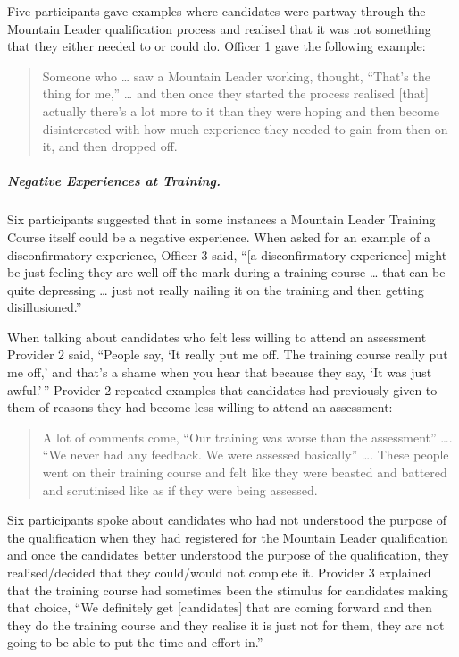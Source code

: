 \documentclass[
  12pt,
  a4paper,
]{book}
\begin{document}
Five participants gave examples where candidates were partway through the Mountain Leader qualification process and realised that it was not something that they either needed to or could do. Officer 1 gave the following example:

\begin{quote}
Someone who \ldots{} saw a Mountain Leader working, thought, ``That's the thing for me,'' \ldots{} and then once they started the process realised {[}that{]} actually there's a lot more to it than they were hoping and then become disinterested with how much experience they needed to gain from then on it, and then dropped off.
\end{quote}

\hypertarget{negative-experiences-at-training.}{%
\subparagraph{Negative Experiences at Training.}\label{negative-experiences-at-training.}}

Six participants suggested that in some instances a Mountain Leader Training Course itself could be a negative experience. When asked for an example of a disconfirmatory experience, Officer 3 said, ``{[}a disconfirmatory experience{]} might be just feeling they are well off the mark during a training course \ldots{} that can be quite depressing \ldots{} just not really nailing it on the training and then getting disillusioned.''

When talking about candidates who felt less willing to attend an assessment Provider 2 said, ``People say, `It really put me off. The training course really put me off,' and that's a shame when you hear that because they say, `It was just awful.'\,'' Provider 2 repeated examples that candidates had previously given to them of reasons they had become less willing to attend an assessment:

\begin{quote}
A lot of comments come, ``Our training was worse than the assessment'' \ldots. ``We never had any feedback. We were assessed basically'' \ldots. These people went on their training course and felt like they were beasted and battered and scrutinised like as if they were being assessed.
\end{quote}

Six participants spoke about candidates who had not understood the purpose of the qualification when they had registered for the Mountain Leader qualification and once the candidates better understood the purpose of the qualification, they realised/decided that they could/would not complete it. Provider 3 explained that the training course had sometimes been the stimulus for candidates making that choice, ``We definitely get {[}candidates{]} that are coming forward and then they do the training course and they realise it is just not for them, they are not going to be able to put the time and effort in.''
\end{document}

